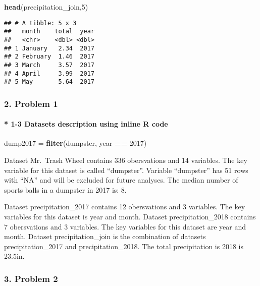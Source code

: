 \documentclass[]{article}
\newenvironment{Shaded}{\begin{snugshade}}{\end{snugshade}}
\newcommand{\DecValTok}[1]{\textcolor[rgb]{0.00,0.00,0.81}{#1}}
\newcommand{\KeywordTok}[1]{\textcolor[rgb]{0.13,0.29,0.53}{\textbf{#1}}}
\newcommand{\NormalTok}[1]{#1}
\newcommand{\OperatorTok}[1]{\textcolor[rgb]{0.81,0.36,0.00}{\textbf{#1}}}
\newcommand{\StringTok}[1]{\textcolor[rgb]{0.31,0.60,0.02}{#1}}
\let\oldparagraph\paragraph
\renewcommand{\paragraph}[1]{\oldparagraph{#1}\mbox{}}
\begin{document}
\begin{Shaded}
\begin{Highlighting}[]
\KeywordTok{head}\NormalTok{(precipitation_join,}\DecValTok{5}\NormalTok{)}
\end{Highlighting}
\end{Shaded}

\begin{verbatim}
## # A tibble: 5 x 3
##   month    total  year
##   <chr>    <dbl> <dbl>
## 1 January   2.34  2017
## 2 February  1.46  2017
## 3 March     3.57  2017
## 4 April     3.99  2017
## 5 May       5.64  2017
\end{verbatim}

\hypertarget{problem-1-2}{%
\subsubsection{2. Problem 1}\label{problem-1-2}}

\hypertarget{datasets-description-using-inline-r-code}{%
\paragraph{* 1-3 Datasets description using inline R
code}\label{datasets-description-using-inline-r-code}}

\begin{Shaded}
\begin{Highlighting}[]
\NormalTok{dump2017 =}\StringTok{ }\KeywordTok{filter}\NormalTok{(dumpster, year }\OperatorTok{==}\StringTok{ }\DecValTok{2017}\NormalTok{)}
\end{Highlighting}
\end{Shaded}

Dataset Mr.~Trash Wheel contains 336 obersvations and 14 variables. The
key variable for this dataset is called ``dumpster''. Variable
``dumpster'' has 51 rows with ``NA'' and will be excluded for future
analyses. The median number of sports balls in a dumpster in 2017 is: 8.

Dataset precipitation\_2017 contains 12 obersvations and 3 variables.
The key variables for this dataset is year and month. Dataset
precipitation\_2018 contains 7 obersvations and 3 variables. The key
variables for this dataset are year and month. Dataset
precipitation\_join is the combination of datasets precipitation\_2017
and precipitation\_2018. The total precipitation is 2018 is 23.5in.

\hypertarget{problem-2}{%
\subsubsection{3. Problem 2}\label{problem-2}}
\end{document}
